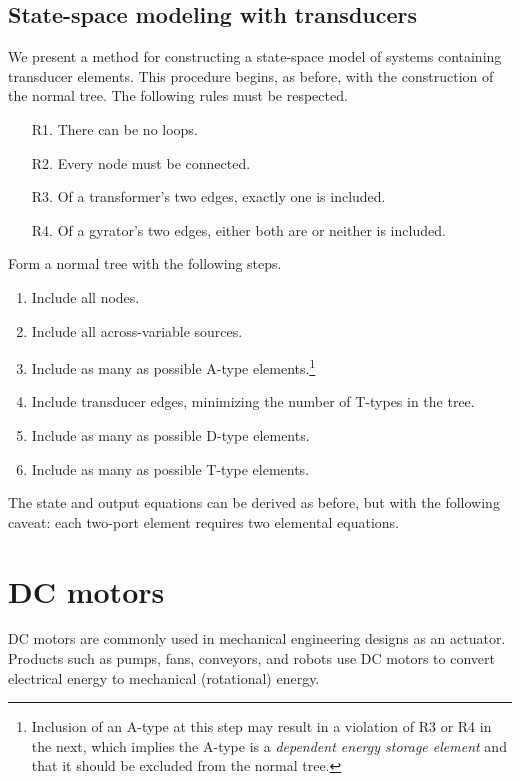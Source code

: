 \documentclass[dynamic_systems.tex]{subfiles}
\begin{document}
\subsection{State-space modeling with transducers}
\tags{}

We present a method for constructing a state-space model of systems containing transducer elements.
This procedure begins, as before, with the construction of the normal tree.
The following rules must be respected.
\tags{}
\begin{enumerate}
	\item[R1.] There can be no loops.
	\item[R2.] Every node must be connected.
	\item[R3.] Of a transformer's two edges, exactly one is included.
	\item[R4.] Of a gyrator's two edges, either both are or neither is included.
\end{enumerate}

Form a normal tree with the following steps.
\tags{}
\begin{enumerate}
	\item Include all nodes.
	\item Include all across-variable sources.
	\item Include as many as possible A-type elements.\footnote{Inclusion of an A-type at this step may result in a violation of R3 or R4 in the next, which implies the A-type is a \emph{dependent energy storage element} and that it should be excluded from the normal tree.}
	\item Include transducer edges, minimizing the number of T-types in the tree. 
	\item Include as many as possible D-type elements.
	\item Include as many as possible T-type elements.
\end{enumerate}

The state and output equations can be derived as before, but with the following caveat: each two-port element requires two elemental equations.
\tags{}


\section{DC motors}
\tags{}

DC motors are commonly used in mechanical engineering designs as an actuator. Products such as pumps, fans, conveyors, and robots use DC motors to convert electrical energy to mechanical (rotational) energy.
\tags{}
\end{document}
